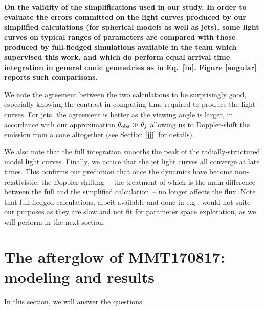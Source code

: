 \bf{On the validity of the simplifications used in our study.} In order to evaluate the errors committed on the light curves produced by our simplified calculations (for spherical models as well as jets), some light curves on typical ranges of parameters are compared with those produced by full-fledged simulations available in the team which supervised this work, and which do perform equal arrival time integration in general conic geometries as in Eq.~\ref{in}. Figure \ref{angular} reports such comparisons.


We note the agreement between the two calculations to be surprisingly good, especially knowing the contrast in computing time required to produce the light curves. For jets, the agreement is better as the viewing angle is larger, in accordance with our approximation $\theta_{\mathrm{obs}} \gg \theta_j$ allowing us to Doppler-shift the emission from a cone altogether (see Section \ref{jjj} for details).

We also note that the full integration smooths the peak of the radially-structured model light curves. Finally, we notice that the jet light curves all converge at late times. This confirms our prediction that once the dynamics have become non-relativistic, the Doppler shifting --~the treatment of which is the main difference between the full and the simplified calculation~-- no longer affects the flux. Note that full-fledged calculations, albeit available and done in e.g \citet{45}, would not suite our purposes as they are slow and not fit for parameter space exploration, as we will perform in the next section.

\section{The afterglow of MMT170817: modeling and results}

In this section, we will answer the questions:

